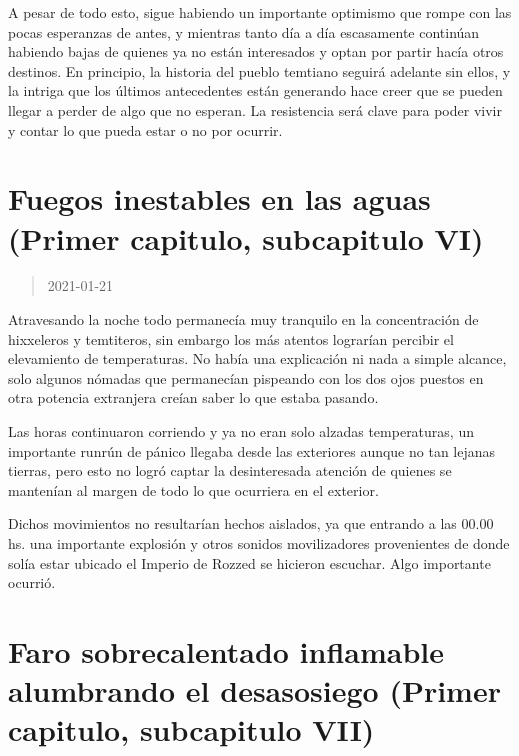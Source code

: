 \documentclass[
  spanish,
]{book}
\begin{document}
A pesar de todo esto, sigue habiendo un importante optimismo que rompe con las pocas esperanzas de antes, y mientras tanto día a día escasamente continúan habiendo bajas de quienes ya no están interesados y optan por partir hacía otros destinos. En principio, la historia del pueblo temtiano seguirá adelante sin ellos, y la intriga que los últimos antecedentes están generando hace creer que se pueden llegar a perder de algo que no esperan.
La resistencia será clave para poder vivir y contar lo que pueda estar o no por ocurrir.

\hypertarget{fuegos-inestables-en-las-aguas-primer-capitulo-subcapitulo-vi}{%
\section{Fuegos inestables en las aguas (Primer capitulo, subcapitulo VI)}\label{fuegos-inestables-en-las-aguas-primer-capitulo-subcapitulo-vi}}

\begin{quote}
2021-01-21
\end{quote}

Atravesando la noche todo permanecía muy tranquilo en la concentración de hixxeleros y temtiteros, sin embargo los más atentos lograrían percibir el elevamiento de temperaturas. No había una explicación ni nada a simple alcance, solo algunos nómadas que permanecían pispeando con los dos ojos puestos en otra potencia extranjera creían saber lo que estaba pasando.

Las horas continuaron corriendo y ya no eran solo alzadas temperaturas, un importante runrún de pánico llegaba desde las exteriores aunque no tan lejanas tierras, pero esto no logró captar la desinteresada atención de quienes se mantenían al margen de todo lo que ocurriera en el exterior.

Dichos movimientos no resultarían hechos aislados, ya que entrando a las 00.00 hs. una importante explosión y otros sonidos movilizadores provenientes de donde solía estar ubicado el Imperio de Rozzed se hicieron escuchar. Algo importante ocurrió.

\hypertarget{faro-sobrecalentado-inflamable-alumbrando-el-desasosiego-primer-capitulo-subcapitulo-vii}{%
\section{Faro sobrecalentado inflamable alumbrando el desasosiego (Primer capitulo, subcapitulo VII)}\label{faro-sobrecalentado-inflamable-alumbrando-el-desasosiego-primer-capitulo-subcapitulo-vii}}
\end{document}
